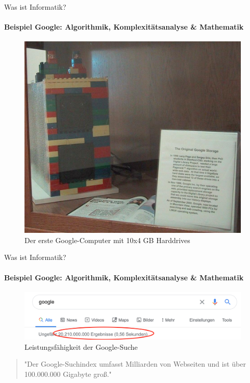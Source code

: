     
    \begin{frame}{Was ist Informatik?}
        \framesubtitle{Beispiel Google: Algorithmik, Komplexitätsanalyse \& Mathematik}
        \begin{figure}
            \centering
            \includegraphics[width=\linewidth,height=0.6\textheight,keepaspectratio]{chapters/02_computer_science/figures/google/storage.jpg}
            \caption{Der erste Google-Computer mit 10x4 GB Harddrives \cite{google:alg:storage}}
            \label{fig:my_label}
        \end{figure}
      
    \end{frame}
    
    
    \begin{frame}{Was ist Informatik?}
        \framesubtitle{Beispiel Google: Algorithmik, Komplexitätsanalyse \& Mathematik}
        \begin{figure}
            \centering
            \includegraphics[width=\linewidth,height=0.6\textheight,keepaspectratio]{chapters/02_computer_science/figures/google/algorithms/results.png}
            \caption{Leistungsfähigkeit der Google-Suche}
            \label{fig:my_label}
        \end{figure}
        
        \begin{quote}
            "Der Google-Suchindex umfasst Milliarden von Webseiten und ist über 100.000.000 Gigabyte groß." \cite{google:alg:index}
        \end{quote}
    \end{frame}
    
